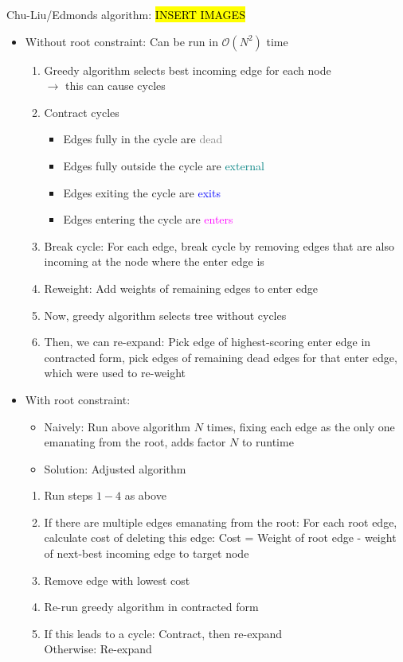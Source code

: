Chu-Liu/Edmonds algorithm:
\hl{INSERT IMAGES}
\begin{itemize}
    \item Without root constraint: Can be run in $\mathcal{O}(N^2)$ time
    \begin{enumerate}
        \item Greedy algorithm selects best incoming edge for each node\\
        $\rightarrow$ this can cause cycles
        \item Contract cycles
        \begin{itemize}
            \item Edges fully in the cycle are \textcolor{gray}{dead}
            \item Edges fully outside the cycle are \textcolor{teal}{external}
            \item Edges exiting the cycle are \textcolor{blue}{exits}
            \item Edges entering  the cycle are \textcolor{magenta}{enters}
        \end{itemize}
        \item Break cycle: For each edge, break cycle by removing edges that are also incoming at the node where the enter edge is
        \item Reweight: Add weights of remaining edges to enter edge
        \item Now, greedy algorithm selects tree without cycles
        \item Then, we can re-expand: Pick edge of highest-scoring enter edge in contracted form, pick edges of remaining dead edges for that enter edge, which were used to re-weight
    \end{enumerate}
    \item With root constraint:
    \begin{itemize}
        \item Naively: Run above algorithm $N$ times, fixing each edge as the only one emanating from the root, adds factor $N$ to runtime
        \item Solution: Adjusted algorithm
    \end{itemize}
    \begin{enumerate}
        \item Run steps $1-4$ as above
        \item If there are multiple edges emanating from the root: For each root edge, calculate cost of deleting this edge: Cost = Weight of root edge - weight of next-best incoming edge to target node
        \item Remove edge with lowest cost
        \item Re-run greedy algorithm in contracted form
        \item If this leads to a cycle: Contract, then re-expand\\
        Otherwise: Re-expand
    \end{enumerate}
\end{itemize}